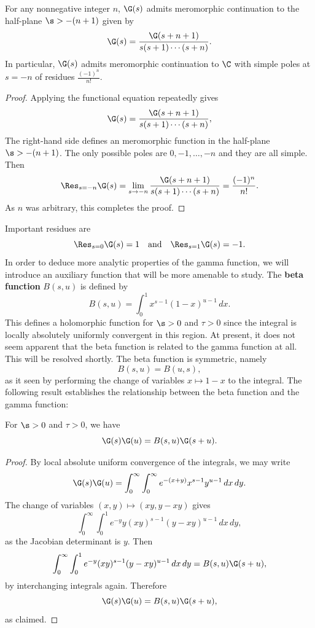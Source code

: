 \documentclass[12pt]{article}
\begin{document}
      \begin{theorem}\label{thm:continuation_of_gamma_function}
        For any nonnegative integer \(n\), \(\G(s)\) admits meromorphic continuation to the half-plane \(\s > -(n+1)\) given by
        \[
          \G(s) = \frac{\G(s+n+1)}{s(s+1) \cdots (s+n)}.
        \]
        In particular, \(\G(s)\) admits meromorphic continuation to \(\C\) with simple poles at \(s = -n\) of residues \(\frac{(-1)^{n}}{n!}\).
      \end{theorem}
      \begin{proof}
        Applying the functional equation repeatedly gives
        \[
          \G(s) = \frac{\G(s+n+1)}{s(s+1) \cdots (s+n)},
        \]
        The right-hand side defines an meromorphic function in the half-plane \(\s > -(n+1)\). The only possible poles are \(0,-1,\ldots,-n\) and they are all simple. Then
        \[
          \Res_{s = -n}\G(s) = \lim_{s \to -n}\frac{\G(s+n+1)}{s(s+1) \cdots (s+n)} = \frac{(-1)^{n}}{n!}. 
        \]
        As \(n\) was arbitrary, this completes the proof.
      \end{proof}

      Important residues are
      \[
        \Res_{s = 0}\G(s) = 1 \quad \text{and} \quad \Res_{s = 1}\G(s) = -1.
      \]
      In order to deduce more analytic properties of the gamma function, we will introduce an auxiliary function that will be more amenable to study. The \textbf{beta function} \(B(s,u)\) is defined by
      \[
        B(s,u) = \int_{0}^{1}x^{s-1}(1-x)^{u-1}\,dx.
      \]
      This defines a holomorphic function for \(\s > 0\) and \(\tau > 0\) since the integral is locally absolutely uniformly convergent in this region. At present, it does not seem apparent that the beta function is related to the gamma function at all. This will be resolved shortly. The beta function is symmetric, namely
      \[
        B(s,u) = B(u,s),
      \]
      as it seen by performing the change of variables \(x \mapsto 1-x\) to the integral. The following result establishes the relationship between the beta function and the gamma function:

      \begin{proposition}\label{prop:integral_reprepsentation_for_beta_function}
        For \(\s > 0\) and \(\tau > 0\), we have
        \[
          \G(s)\G(u) = B(s,u)\G(s+u).
        \]
      \end{proposition}
      \begin{proof}
        By local absolute uniform convergence of the integrals, we may write
        \[
          \G(s)\G(u) = \int_{0}^{\infty}\int_{0}^{\infty}e^{-(x+y)}x^{s-1}y^{u-1}\,dx\,dy.
        \]
        The change of variables \((x,y) \mapsto (xy,y-xy)\) gives 
        \[
          \int_{0}^{\infty}\int_{0}^{1}e^{-y}y(xy)^{s-1}(y-xy)^{u-1}\,dx\,dy,
        \]
        as the Jacobian determinant is \(y\). Then
        \[
          \int_{0}^{\infty}\int_{0}^{1}e^{-y}(xy)^{s-1}(y-xy)^{u-1}\,dx\,dy = B(s,u)\G(s+u),
        \]
        by interchanging integrals again. Therefore
        \[
          \G(s)\G(u) = B(s,u)\G(s+u),
        \]
        as claimed.
      \end{proof}
\end{document}
